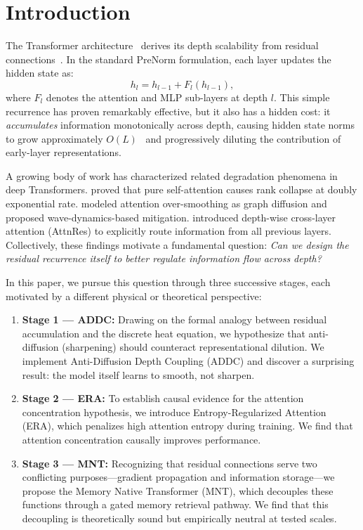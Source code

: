 \documentclass[10pt]{article}
\begin{document}
\section{Introduction}

The Transformer architecture~\cite{vaswani2017attention} derives its depth scalability from residual connections~\cite{he2016deep}. In the standard PreNorm formulation, each layer updates the hidden state as:
\begin{equation}
    h_l = h_{l-1} + F_l(h_{l-1}),
    \label{eq:standard_residual}
\end{equation}
where $F_l$ denotes the attention and MLP sub-layers at depth $l$. This simple recurrence has proven remarkably effective, but it also has a hidden cost: it \emph{accumulates} information monotonically across depth, causing hidden state norms to grow approximately $O(L)$~\cite{kimiteam2026attnres} and progressively diluting the contribution of early-layer representations.

A growing body of work has characterized related degradation phenomena in deep Transformers. \cite{dong2021attention} proved that pure self-attention causes rank collapse at doubly exponential rate. \cite{wavy2025neurips} modeled attention over-smoothing as graph diffusion and proposed wave-dynamics-based mitigation. \cite{kimiteam2026attnres} introduced depth-wise cross-layer attention (AttnRes) to explicitly route information from all previous layers. Collectively, these findings motivate a fundamental question: \emph{Can we design the residual recurrence itself to better regulate information flow across depth?}

In this paper, we pursue this question through three successive stages, each motivated by a different physical or theoretical perspective:

\begin{enumerate}[leftmargin=*,itemsep=2pt]
    \item \textbf{Stage 1 --- ADDC:} Drawing on the formal analogy between residual accumulation and the discrete heat equation, we hypothesize that anti-diffusion (sharpening) should counteract representational dilution. We implement Anti-Diffusion Depth Coupling (ADDC) and discover a surprising result: the model itself learns to smooth, not sharpen.
    
    \item \textbf{Stage 2 --- ERA:} To establish causal evidence for the attention concentration hypothesis, we introduce Entropy-Regularized Attention (ERA), which penalizes high attention entropy during training. We find that attention concentration causally improves performance.
    
    \item \textbf{Stage 3 --- MNT:} Recognizing that residual connections serve two conflicting purposes---gradient propagation and information storage---we propose the Memory Native Transformer (MNT), which decouples these functions through a gated memory retrieval pathway. We find that this decoupling is theoretically sound but empirically neutral at tested scales.
\end{enumerate}
\end{document}
